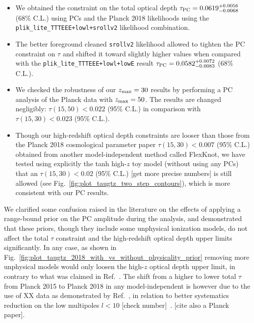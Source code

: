 \documentclass[prd,twocolumn,amsmath,amssymb,floatfix,superscriptaddress,nofootinbib]{revtex4-1}
\newcommand{\zmax}{z_{\rm max}}
\begin{document}
\begin{itemize}

    \item {We obtained the constraint on the total optical depth $\tau_{\rm PC} = 0.0619^{+0.0056}_{-0.0068}$ (68\% C.L.) 
    using PCs and the Planck 2018 likelihoods using the \texttt{plik\_lite\_TTTEEE+lowl+srollv2} likelihood combination.}
    
    \item {The better foreground cleaned \texttt{srollv2} likelihood allowed to tighten the PC constraint on $\tau$ and shifted it toward slightly higher values when compared with the \texttt{plik\_lite\_TTTEEE+lowl+lowE} result  $\tau_{\rm PC} = 0.0582 ^{+0.0072}_{-0.0083}$ (68\% C.L.).}
    
    \item {We checked the robustness of our $\zmax=30$ results by performing a PC analysis of the Planck data with $\zmax = 50$. The results are changed negligibly: $\tau(15, 50) < 0.022 $ (95\% C.L.) in comparison with $\tau(15, 30) < 0.023$ (95\% C.L.).}
    
     \item {Though our high-redshift optical depth constraints are looser than those from the Planck 2018 cosmological parameter paper $\tau(15, 30) < 0.007$ (95\% C.L.) obtained from another model-independent method called FlexKnot, we have tested using explicitly the tanh high-$z$ toy model (without using any PCs) that an $\tau(15, 30) < 0.02$ (95\% C.L.) [get more precise numbers] is still allowed (see Fig.~\ref{fig:plot_taugtz_two_step_contours}), which is more consistent with our PC results.}
     
\end{itemize}

We clarified some confusion raised in the literature on the effects of applying a range-bound prior on the PC amplitude during the analysis, and demonstrated that these priors, though they include some unphysical ionization models, do not affect the total $\tau$ constraint and the high-redshift optical depth upper limits significantly. In any case, as shown in Fig.~\ref{fig:plot_taugtz_2018_with_vs_without_physicality_prior} removing more unphysical models would only loosen the high-$z$ optical depth upper limit, in contrary to what was claimed in Ref.~\cite{Millea:2018bko}. The shift from a higher to lower total $\tau$ from Planck 2015 to Planck 2018 in any model-independent is however due to the use of XX data as demonstrated by Ref.~\cite{Millea:2018bko}, in relation to better systematics reduction on the low multipoles $l<10$ [check number]~\cite{Heinrich:2018btc}. [cite also a Planck paper].
\end{document}
